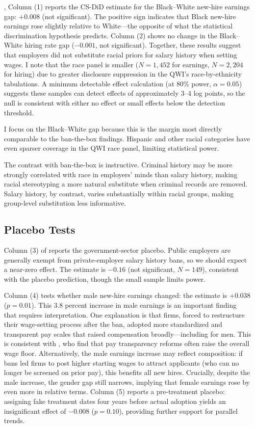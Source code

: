 \documentclass[12pt]{article}
\begin{document}
, Column (1) reports the CS-DiD estimate for the Black--White new-hire earnings gap: $+0.008$ (not significant). The positive sign indicates that Black new-hire earnings rose slightly relative to White---the opposite of what the statistical discrimination hypothesis predicts. Column (2) shows no change in the Black--White hiring rate gap ($-0.001$, not significant). Together, these results suggest that employers did not substitute racial priors for salary history when setting wages. I note that the race panel is smaller ($N = 1{,}452$ for earnings, $N = 2{,}204$ for hiring) due to greater disclosure suppression in the QWI's race-by-ethnicity tabulations. A minimum detectable effect calculation (at 80\% power, $\alpha = 0.05$) suggests these samples can detect effects of approximately 3--4 log points, so the null is consistent with either no effect or small effects below the detection threshold.

I focus on the Black--White gap because this is the margin most directly comparable to the \citet{DoleacHansen2020} ban-the-box findings. Hispanic and other racial categories have even sparser coverage in the QWI race panel, limiting statistical power.

The contrast with ban-the-box is instructive. Criminal history may be more strongly correlated with race in employers' minds than salary history, making racial stereotyping a more natural substitute when criminal records are removed. Salary history, by contrast, varies substantially within racial groups, making group-level substitution less informative.

\subsection{Placebo Tests}

Column (3) of  reports the government-sector placebo. Public employers are generally exempt from private-employer salary history bans, so we should expect a near-zero effect. The estimate is $-0.16$ (not significant, $N = 149$), consistent with the placebo prediction, though the small sample limits power.

Column (4) tests whether male new-hire earnings changed: the estimate is $+0.038$ ($p = 0.01$). This 3.8 percent increase in male earnings is an important finding that requires interpretation. One explanation is that firms, forced to restructure their wage-setting process after the ban, adopted more standardized and transparent pay scales that raised compensation broadly---including for men. This is consistent with \citet{BambergaStigler2024}, who find that pay transparency reforms often raise the overall wage floor. Alternatively, the male earnings increase may reflect composition: if bans led firms to post higher starting wages to attract applicants (who can no longer be screened on prior pay), this benefits all new hires. Crucially, despite the male increase, the gender gap still narrows, implying that female earnings rose by even more in relative terms. Column (5) reports a pre-treatment placebo: assigning fake treatment dates four years before actual adoption yields an insignificant effect of $-0.008$ ($p = 0.10$), providing further support for parallel trends.
\end{document}
